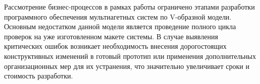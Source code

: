 \documentclass[
    numbers=section,
    document-code={ВКРБ--09.03.04--10.19--XX--26--81}
]{../latex/fqw}
\begin{document}
    Рассмотрение бизнес-процессов в рамках работы ограничено этапами разработки программного обеспечения
    мультиагетных систем по V-образной модели.
    Основным недостатком данной модели является проведение полного цикла проверок
    на уже изготовленном макете системы\nbspace\cite{mathurAdvancementsVModel2010}.
    В случае выявления критических ошибок возникает необходимость внесения дорогостоящих конструктивных изменений
    в готовый прототип или применения дополнительных организационных мер для их устранения,
    что значительно увеличивает сроки и стоимость разработки.
\end{document}
